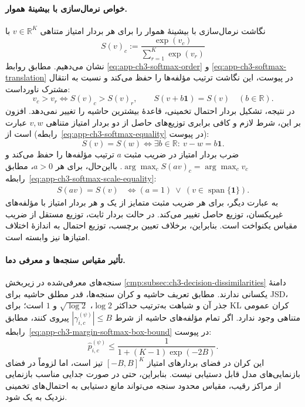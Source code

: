 \paragraph{خواص نرمال‌سازی با بیشینهٔ هموار.}
نگاشت نرمال‌سازی با بیشینهٔ هموار را برای هر بردار
امتیاز متناهی $v\in\mathbb R^K$ با
\begin{equation}\label{cmp:eq:ch3-score-softmax-map}
S(v)_c:=\frac{\exp(v_c)}{\sum_{r=1}^{K}\exp(v_r)}
\end{equation}
نشان می‌دهیم. مطابق روابط
\eqref{eq:app-ch3-softmax-order} و
\eqref{eq:app-ch3-softmax-translation} در پیوست،
این نگاشت ترتیب مؤلفه‌ها را حفظ می‌کند و نسبت
به انتقال مشترک ناورداست:
\[
v_c>v_r\iff S(v)_c>S(v)_r,\qquad
S(v+b\mathbf1)=S(v)\quad(b\in\mathbb R).
\]
در نتیجه، تشکیل بردار احتمال تخمینی، قاعدهٔ بیشترین
حاشیه را تغییر نمی‌دهد.
افزون بر این، شرط لازم و کافی برابری توزیع‌های
حاصل از دو بردار امتیاز متناهی $v,w$ عبارت است از
(رابطه~\eqref{eq:app-ch3-softmax-equality} در پیوست):
\begin{equation}\label{cmp:eq:ch3-score-softmax-equality}
\boxed{S(v)=S(w)\iff
\exists b\in\mathbb R:\ v-w=b\mathbf1.}
\end{equation}
ضرب بردار امتیاز در ضریب مثبت $a$ ترتیب مؤلفه‌ها
را حفظ می‌کند و $\arg\max_c S(av)_c=\arg\max_c v_c$.
بااین‌حال، برای هر $a>0$، مطابق
رابطه~\eqref{eq:app-ch3-softmax-scale-equality}:
\begin{equation}\label{cmp:eq:ch3-score-softmax-scale-equality}
\boxed{\begin{aligned}
S(av)=S(v)
&\iff (a=1)\ \lor\ (v\in\operatorname{span}\{\mathbf1\}).
\end{aligned}}
\end{equation}
به عبارت دیگر، برای هر ضریب مثبت متمایز از یک و
هر بردار امتیاز با مؤلفه‌های غیریکسان، توزیع حاصل
تغییر می‌کند. در حالت بردار ثابت، توزیع مستقل از
ضریب مقیاس یکنواخت است. بنابراین، برخلاف تعیین
برچسب، توزیع احتمال به اندازهٔ اختلاف امتیازها
نیز وابسته است.

\paragraph{تأثیر مقیاس سنجه‌ها و معرفی دما.}
سنجه‌های معرفی‌شده در زیربخش
\ref{cmp:subsec:ch3-decision-dissimilarities}
دامنهٔ یکسانی ندارند. مطابق تعریف حاشیه و کران
سنجه‌ها، قدر مطلق حاشیه برای JSD، جذر آن و شباهت
به‌ترتیب حداکثر $\log2$، $\sqrt{\log2}$ و $1$ است؛
برای KL کران عمومی متناهی وجود ندارد.
اگر تمام مؤلفه‌های حاشیه از شرط
$|\gamma_{i,c}^{(\psi)}|\le B$ پیروی کنند، مطابق
رابطه~\eqref{eq:app-ch3-margin-softmax-box-bound} در پیوست:
\begin{equation}\label{cmp:eq:ch3-margin-softmax-unit-ceiling}
\widehat p_{i,c}^{(\psi)}
\le \frac{1}{1+(K-1)\exp(-2B)}.
\end{equation}
این کران در فضای بردارهای امتیاز $[-B,B]^K$ تیز است،
اما لزوماً در فضای بازنمایی‌های مدل قابل دستیابی نیست.
بنابراین، حتی در صورت جدایی مناسب بازنمایی از
مراکز رقیب، مقیاس محدود سنجه می‌تواند مانع دستیابی
به احتمال‌های تخمینی نزدیک به یک شود.

